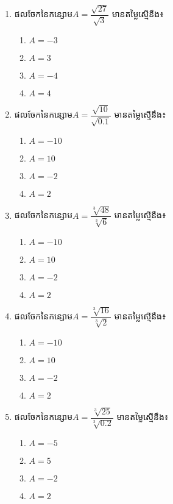 \begin{enumerate}
\item ផលចែកនៃកន្សោម$A=\dfrac{\sqrt{27}}{\sqrt{3}}$  មានតម្លៃស្មើនឹង៖
\begin{multicols}{4}
\begin{enumerate}[label=\alph*.]
	\item $A=-3$
	\item $A=3$
	\item $A=-4$
	\item $A=4$
\end{enumerate}
\end{multicols}

\item ផលចែកនៃកន្សោម$A=\dfrac{\sqrt{10}}{\sqrt{0.1}}$  មានតម្លៃស្មើនឹង៖
\begin{multicols}{4}
\begin{enumerate}[label=\alph*.]
	\item $A=-10$
	\item $A=10$
	\item $A=-2$
	\item $A=2$
\end{enumerate}
\end{multicols}

\item ផលចែកនៃកន្សោម$A=\dfrac{\sqrt[3]{48}}{\sqrt[3]{6}}$  មានតម្លៃស្មើនឹង៖
\begin{multicols}{4}
\begin{enumerate}[label=\alph*.]
	\item $A=-10$
	\item $A=10$
	\item $A=-2$
	\item $A=2$
\end{enumerate}
\end{multicols}
\item ផលចែកនៃកន្សោម$A=\dfrac{\sqrt[3]{16}}{\sqrt[3]{2}}$  មានតម្លៃស្មើនឹង៖
\begin{multicols}{4}
\begin{enumerate}[label=\alph*.]
	\item $A=-10$
	\item $A=10$
	\item $A=-2$
	\item $A=2$
\end{enumerate}
\end{multicols}

\item ផលចែកនៃកន្សោម$A=\dfrac{\sqrt[3]{25}}{\sqrt[3]{0.2}}$  មានតម្លៃស្មើនឹង៖
\begin{multicols}{4}
\begin{enumerate}[label=\alph*.]
	\item $A=-5$
	\item $A=5$
	\item $A=-2$
	\item $A=2$
\end{enumerate}
\end{multicols}


\end{enumerate}
